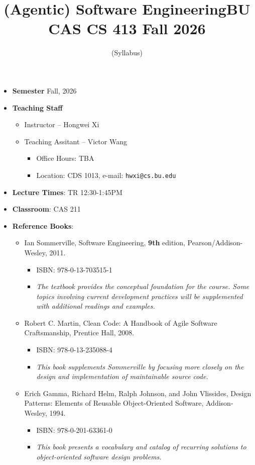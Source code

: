 \documentclass[11pt]{article}
\title{(Agentic) Software Engineering\break BU CAS CS 413 Fall 2026}
\author{(Syllabus)}
\date{}
\begin{document}
\maketitle
\thispagestyle{empty}

\begin{itemize}
\item
{\bf Semester}
Fall, 2026
\item
{\bf Teaching Staff}
\begin{itemize}
\item
Instructor -- Hongwei Xi
\item
Teaching Assitant -- Victor Wang
\begin{itemize}
\item
Office Hours: TBA
\item
Location: CDS 1013, e-mail: \texttt{hwxi@cs.bu.edu}
\end{itemize}
\end{itemize}

\item {\bf Lecture Times}: TR 12:30-1:45PM
\item {\bf Classroom}: CAS 211
\item {\bf Reference Books}:\kern6pt
\begin{itemize}
\item
Ian Sommerville, Software Engineering, {\bf 9th} edition,
Pearson/Addison-Wesley, 2011.
\begin{itemize}
\item ISBN: 978-0-13-703515-1
\item {\em The textbook provides the
conceptual foundation for the course. Some topics involving current
development practices will be supplemented with additional readings
and examples.}
\end{itemize}
\item
Robert C. Martin, Clean Code: A Handbook of Agile Software Craftsmanship, Prentice Hall, 2008.
\begin{itemize}
\item 
ISBN: 978-0-13-235088-4
\item
{\em
This book supplements Sommerville by focusing more closely on the
design and implementation of maintainable source code.}
\end{itemize}
\item
Erich Gamma, Richard Helm, Ralph Johnson, and John Vlissides, Design
Patterns: Elements of Reusable Object-Oriented Software,
Addison-Wesley, 1994.
\begin{itemize}
\item
ISBN: 978-0-201-63361-0
\item
{\em
This book presents a vocabulary and catalog of recurring solutions to
object-oriented software design problems.}
\end{itemize}
\end{itemize}


\end{itemize}
\end{document}
